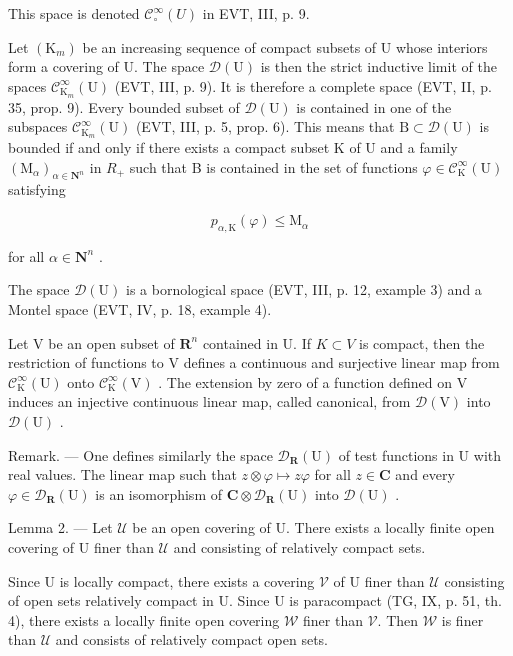 This space is denoted \(\mathcal{C}_{\circ}^{\infty}(U)\) in EVT, III, p. 9.

Let \((\mathrm{K}_{m})\) be an increasing sequence of compact subsets of U whose interiors form a covering of U. The space \(\mathcal{D}(\mathrm{U})\) is then the strict inductive limit of the spaces \(\mathcal{C}_{\mathrm{K}_{m}}^{\infty}(\mathrm{U})\) (EVT, III, p. 9). It is therefore a complete space (EVT, II, p. 35, prop. 9). Every bounded subset of \(\mathcal{D}(\mathrm{U})\) is contained in one of the subspaces \(\mathcal{C}_{\mathrm{K}_{m}}^{\infty}(\mathrm{U})\) (EVT, III, p. 5, prop. 6). This means that \(\mathrm{B}\subset\mathcal{D}(\mathrm{U})\) is bounded if and only if there exists a compact subset K of U and a family \((\mathrm{M}_{\alpha})_{\alpha\in\mathbf{N}^{n}}\) in \(R_{+}\) such that B is contained in the set of functions \(\varphi\in\mathcal{C}_{\mathrm{K}}^{\infty}(\mathrm{U})\) satisfying

\[
p _ {\alpha , \mathrm{K}} (\varphi) \leqslant \mathrm{M} _ {\alpha}
\]

for all \(\alpha\in\mathbf{N}^{n}\) .

The space \(\mathcal{D}(\mathrm{U})\) is a bornological space (EVT, III, p. 12, example 3) and a Montel space (EVT, IV, p. 18, example 4).

Let V be an open subset of \(\mathbf{R}^{n}\) contained in U. If \(K \subset V\) is compact, then the restriction of functions to V defines a continuous and surjective linear map from \(\mathcal{C}_{\mathrm{K}}^{\infty}(\mathrm{U})\) onto \(\mathcal{C}_{\mathrm{K}}^{\infty}(\mathrm{V})\) . The extension by zero of a function defined on V induces an injective continuous linear map, called canonical, from \(\mathcal{D}(\mathrm{V})\) into \(\mathcal{D}(\mathrm{U})\) .

Remark. --- One defines similarly the space \(\mathcal{D}_{\mathbf{R}}(\mathrm{U})\) of test functions in U with real values. The linear map such that \(z \otimes \varphi \mapsto z\varphi\) for all \(z \in \mathbf{C}\) and every \(\varphi \in \mathcal{D}_{\mathbf{R}}(\mathrm{U})\) is an isomorphism of \(\mathbf{C} \otimes \mathcal{D}_{\mathbf{R}}(\mathrm{U})\) into \(\mathcal{D}(\mathrm{U})\) .

Lemma 2. --- Let \(\mathcal{U}\) be an open covering of U. There exists a locally finite open covering of U finer than \(\mathcal{U}\) and consisting of relatively compact sets.

Since U is locally compact, there exists a covering \(\mathcal{V}\) of U finer than \(\mathcal{U}\) consisting of open sets relatively compact in U. Since U is paracompact (TG, IX, p. 51, th. 4), there exists a locally finite open covering \(\mathcal{W}\) finer than \(\mathcal{V}\). Then \(\mathcal{W}\) is finer than \(\mathcal{U}\) and consists of relatively compact open sets.

